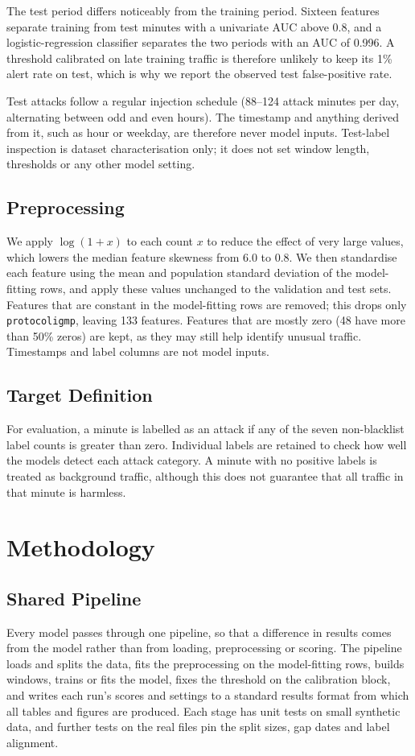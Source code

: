\documentclass[conference]{IEEEtran}
\begin{document}
The test period differs noticeably from the training period. Sixteen features separate training from test minutes with a univariate AUC above 0.8, and a logistic-regression classifier separates the two periods with an AUC of 0.996. A threshold calibrated on late training traffic is therefore unlikely to keep its 1\% alert rate on test, which is why we report the observed test false-positive rate.

Test attacks follow a regular injection schedule (88--124 attack minutes per day, alternating between odd and even hours). The timestamp and anything derived from it, such as hour or weekday, are therefore never model inputs. Test-label inspection is dataset characterisation only; it does not set window length, thresholds or any other model setting.

\subsection{Preprocessing}
We apply $\log(1+x)$ to each count $x$ to reduce the effect of very large values, which lowers the median feature skewness from 6.0 to 0.8. We then standardise each feature using the mean and population standard deviation of the model-fitting rows, and apply these values unchanged to the validation and test sets. Features that are constant in the model-fitting rows are removed; this drops only \texttt{protocoligmp}, leaving 133 features. Features that are mostly zero (48 have more than 50\% zeros) are kept, as they may still help identify unusual traffic. Timestamps and label columns are not model inputs.

\subsection{Target Definition}
For evaluation, a minute is labelled as an attack if any of the seven non-blacklist label counts is greater than zero. Individual labels are retained to check how well the models detect each attack category. A minute with no positive labels is treated as background traffic, although this does not guarantee that all traffic in that minute is harmless.

\section{Methodology}
\subsection{Shared Pipeline}
Every model passes through one pipeline, so that a difference in results comes from the model rather than from loading, preprocessing or scoring. The pipeline loads and splits the data, fits the preprocessing on the model-fitting rows, builds windows, trains or fits the model, fixes the threshold on the calibration block, and writes each run's scores and settings to a standard results format from which all tables and figures are produced. Each stage has unit tests on small synthetic data, and further tests on the real files pin the split sizes, gap dates and label alignment.
\end{document}

